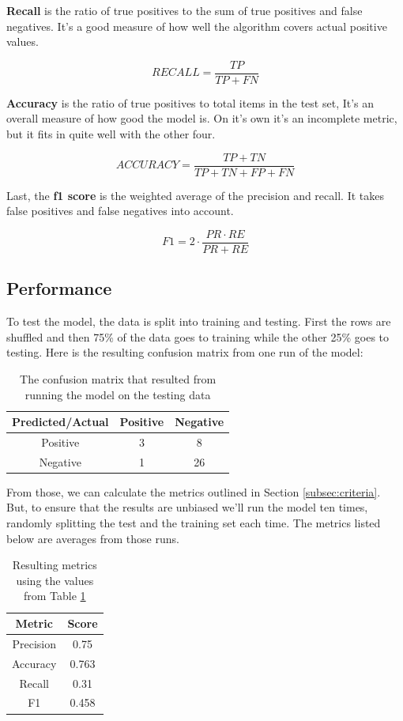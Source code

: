 \documentclass[11pt, twoside, reqno]{book}
\begin{document}
\textbf{Recall} is the ratio of true positives to the sum of true positives and false negatives. It's a good measure of how well the algorithm covers actual positive values. 

\begin{equation}
\label{eq:recall}
RECALL = \dfrac{TP}{TP+FN}
\end{equation}

\textbf{Accuracy} is the ratio of true positives to total items in the test set, It's an overall measure of how good the model is. On it's own it's an incomplete metric, but it fits in quite well with the other four. 

\begin{equation}
\label{eq:accuracy}
ACCURACY = \dfrac{TP+TN}{TP+TN+FP+FN}
\end{equation}

Last, the \textbf{f1 score} is the weighted average of the precision and recall. It takes false positives and false negatives into account. 

\begin{equation}
\label{eq:f1}
F1 = 2 \cdot \dfrac{PR \cdot RE}{PR + RE}
\end{equation}

\subsection{Performance}
\hspace{0.2in} To test the model, the data is split into training and testing. First the rows are shuffled and then 75\% of the data goes to training while the other 25\% goes to testing. Here is the resulting confusion matrix from one run of the model:
\begin{table}[H]
\centering
\begin{tabular}{|c|c|c|}
	\hline
	Predicted/Actual & Positive & Negative \\
	\hline
	Positive & 3 & 8 \\
	\hline
	Negative & 1 &  26\\
	\hline
\end{tabular}
\caption{The confusion matrix that resulted from running the model on the testing data}\label{fig:out_confusion_matrix}
\end{table}
From those, we can calculate the metrics outlined in Section \ref{subsec:criteria}. But, to ensure that the results are unbiased we'll run the model ten times, randomly splitting the test and the training set each time. The metrics listed below are averages from those runs. 
\begin{table}[H]
\centering
\begin{tabular}{|c|c|}
	\hline
	Metric & Score \\
	\hline
	Precision & 0.75 \\
	\hline
	Accuracy & 0.763\\
	\hline
	Recall & 0.31 \\
	\hline
	F1 & 0.458 \\
	\hline
\end{tabular}
\caption{Resulting metrics using the values from Table \ref{fig:out_confusion_matrix}}\label{fig:metrics}
\end{table}
\end{document}
